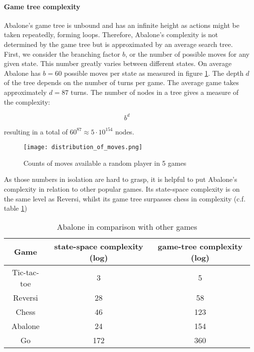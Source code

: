 \paragraph{Game tree complexity} Abalone's game tree is unbound and has an infinite height as actions might be taken repeatedly, forming loops. Therefore, Abalone's complexity is not determined by the game tree but is approximated by an average search tree. First, we consider the branching factor $ b $, or the number of possible moves for any given state. This number greatly varies between different states. On average Abalone has $ b = 60 $ possible moves per state as measured in figure \ref{branching_factor}. The depth $ d $ of the tree depends on the number of turns per game. The average game takes approximately $ d = 87 $ turns. The number of nodes in a tree gives a measure of the complexity:

\begin{equation}
    b^d
\end{equation}

resulting in a total of $60^{87} \approx 5 \cdot 10^{154}$ nodes. \cite{lemmens_constructing_2005}

\begin{figure}
    \centering
    \texttt{[image: distribution\_of\_moves.png]}
    \caption{Counts of moves available a random player in 5 games}
    \label{branching_factor}
\end{figure}

As those numbers in isolation are hard to grasp, it is helpful to put Abalone's complexity in relation to other popular games. Its state-space complexity is on the same level as Reversi, whilst its game tree surpasses chess in complexity (c.f. table \ref{complexity_table})

\begin{table}
    \begin{center}
        \begin{tabular}{  c | c | c  }
            Game        & state-space complexity (log) & game-tree complexity (log) \\
            \hline
            \hline
            Tic-tac-toe & 3                            & 5                          \\
            Reversi     & 28                           & 58                         \\
            Chess       & 46                           & 123                        \\
            Abalone     & 24                           & 154                        \\
            Go          & 172                          & 360                        \\
        \end{tabular}
    \end{center}
    \caption{Abalone in comparison with other games \cite{chorus_implementing_2009}}
    \label{complexity_table}
\end{table}

